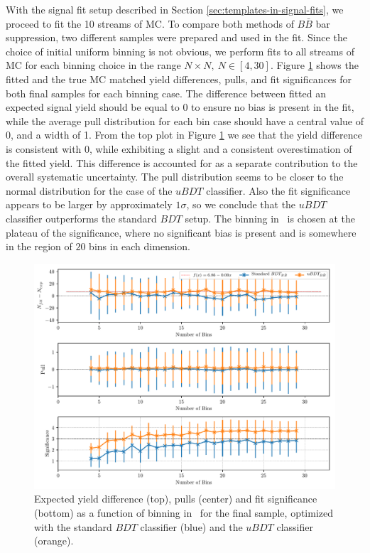 With the signal fit setup described in Section \ref{sec:templates-in-signal-fits}, we proceed to fit the 10 streams of MC. To compare both methods of $B \bar B$ bar suppression, two different samples were prepared and used in the fit. Since the choice of initial uniform binning is not obvious, we perform fits to all streams of MC for each binning choice in the range $N\times N,~N\in[4,30]$. Figure \ref{fig:sig_binning} shows the fitted and the true MC matched yield differences, pulls, and fit significances for both final samples for each binning case. The difference between fitted an expected signal yield should be equal to 0 to ensure no bias is present in the fit, while the average pull distribution for each bin case should have a central value of 0, and a width of 1. From the top plot in Figure \ref{fig:sig_binning} we see that the yield difference is consistent with 0, while exhibiting a slight and a consistent overestimation of the fitted yield. This difference is accounted for as a separate contribution to the overall systematic uncertainty. The pull distribution seems to be closer to the normal distribution for the case of the $uBDT$ classifier. Also the fit significance appears to be larger by approximately $1\sigma$, so we conclude that the $uBDT$ classifier outperforms the standard $BDT$ setup. The binning in \vars~is chosen at the plateau of the significance, where no significant bias is present and is somewhere in the region of $20$ bins in each dimension.

\begin{figure}[H]
	\centering
	\captionsetup{width=0.8\linewidth}
	\includegraphics[width=\linewidth]{fig/sig_binning}
	\caption{Expected yield difference (top), pulls (center) and fit significance (bottom) as a function of binning in \vars~for the final sample, optimized with the standard $BDT$ classifier (blue) and the $uBDT$ classifier (orange).}
	\label{fig:sig_binning}
\end{figure}

